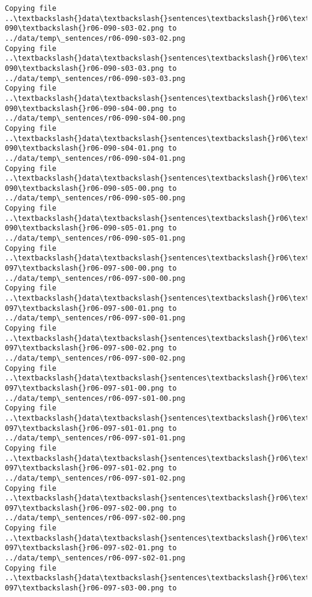\documentclass[11pt]{article}
\begin{document}
\begin{Verbatim}[commandchars=\\\{\}]
Copying file ..\textbackslash{}data\textbackslash{}sentences\textbackslash{}r06\textbackslash{}r06-090\textbackslash{}r06-090-s03-02.png to
../data/temp\_sentences/r06-090-s03-02.png
Copying file ..\textbackslash{}data\textbackslash{}sentences\textbackslash{}r06\textbackslash{}r06-090\textbackslash{}r06-090-s03-03.png to
../data/temp\_sentences/r06-090-s03-03.png
Copying file ..\textbackslash{}data\textbackslash{}sentences\textbackslash{}r06\textbackslash{}r06-090\textbackslash{}r06-090-s04-00.png to
../data/temp\_sentences/r06-090-s04-00.png
Copying file ..\textbackslash{}data\textbackslash{}sentences\textbackslash{}r06\textbackslash{}r06-090\textbackslash{}r06-090-s04-01.png to
../data/temp\_sentences/r06-090-s04-01.png
Copying file ..\textbackslash{}data\textbackslash{}sentences\textbackslash{}r06\textbackslash{}r06-090\textbackslash{}r06-090-s05-00.png to
../data/temp\_sentences/r06-090-s05-00.png
Copying file ..\textbackslash{}data\textbackslash{}sentences\textbackslash{}r06\textbackslash{}r06-090\textbackslash{}r06-090-s05-01.png to
../data/temp\_sentences/r06-090-s05-01.png
Copying file ..\textbackslash{}data\textbackslash{}sentences\textbackslash{}r06\textbackslash{}r06-097\textbackslash{}r06-097-s00-00.png to
../data/temp\_sentences/r06-097-s00-00.png
Copying file ..\textbackslash{}data\textbackslash{}sentences\textbackslash{}r06\textbackslash{}r06-097\textbackslash{}r06-097-s00-01.png to
../data/temp\_sentences/r06-097-s00-01.png
Copying file ..\textbackslash{}data\textbackslash{}sentences\textbackslash{}r06\textbackslash{}r06-097\textbackslash{}r06-097-s00-02.png to
../data/temp\_sentences/r06-097-s00-02.png
Copying file ..\textbackslash{}data\textbackslash{}sentences\textbackslash{}r06\textbackslash{}r06-097\textbackslash{}r06-097-s01-00.png to
../data/temp\_sentences/r06-097-s01-00.png
Copying file ..\textbackslash{}data\textbackslash{}sentences\textbackslash{}r06\textbackslash{}r06-097\textbackslash{}r06-097-s01-01.png to
../data/temp\_sentences/r06-097-s01-01.png
Copying file ..\textbackslash{}data\textbackslash{}sentences\textbackslash{}r06\textbackslash{}r06-097\textbackslash{}r06-097-s01-02.png to
../data/temp\_sentences/r06-097-s01-02.png
Copying file ..\textbackslash{}data\textbackslash{}sentences\textbackslash{}r06\textbackslash{}r06-097\textbackslash{}r06-097-s02-00.png to
../data/temp\_sentences/r06-097-s02-00.png
Copying file ..\textbackslash{}data\textbackslash{}sentences\textbackslash{}r06\textbackslash{}r06-097\textbackslash{}r06-097-s02-01.png to
../data/temp\_sentences/r06-097-s02-01.png
Copying file ..\textbackslash{}data\textbackslash{}sentences\textbackslash{}r06\textbackslash{}r06-097\textbackslash{}r06-097-s03-00.png to

\end{Verbatim}
\end{document}
